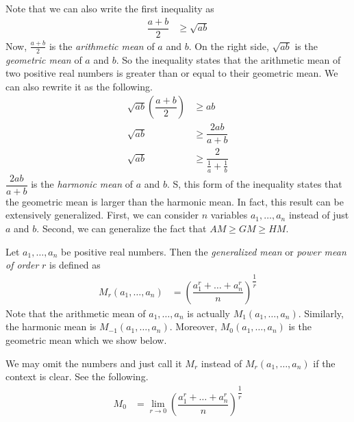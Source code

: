 \documentclass{subfile}
\begin{document}
	Note that we can also write the first inequality as
		\begin{align*}
			\dfrac{a+b}{2}
				& \geq\sqrt{ab}
		\end{align*}
	Now, $\frac{a+b}{2}$ is the \textit{arithmetic mean} of $a$ and $b$. On the right side, $\sqrt{ab}$ is the \textit{geometric mean} of $a$ and $b$. So the inequality states that the arithmetic mean of two positive real numbers is greater than or equal to their geometric mean. We can also rewrite it as the following.
		\begin{align*}
			\sqrt{ab}\left(\dfrac{a+b}{2}\right)
				& \geq ab\\
			\sqrt{ab}
				& \geq\dfrac{2ab}{a+b}\\
			\sqrt{ab}
				& \geq\dfrac{2}{\frac{1}{a}+\frac{1}{b}}
		\end{align*}
	$\dfrac{2ab}{a+b}$ is the \textit{harmonic mean} of $a$ and $b$. S, this form of the inequality states that the geometric mean is larger than the harmonic mean. In fact, this result can be extensively generalized. First, we can consider $n$ variables $a_1,\ldots,a_n$ instead of just $a$ and $b$. Second, we can generalize the fact that $AM\geq GM\geq HM$.
		\begin{definition}
			Let $a_1,\ldots,a_n$ be positive real numbers. Then the \textit{generalized mean} or \textit{power mean of order} $r$ is defined as
				\begin{align*}
					M_r(a_1,\ldots,a_n)
						& = \left(\dfrac{a_1^r+\ldots+a_n^r}{n}\right)^{\dfrac{1}{r}}
				\end{align*}
			Note that the arithmetic mean of $a_1,\ldots,a_n$ is actually $M_1(a_1,\ldots,a_n)$. Similarly, the harmonic mean is $M_{-1}(a_1,\ldots,a_n)$. Moreover, $M_0(a_1,\ldots,a_n)$ is the geometric mean which we show below.
		\end{definition}
	We may omit the numbers and just call it $M_r$ instead of $M_r(a_1,\ldots,a_n)$ if the context is clear. See the following.
		\begin{align*}
			M_0
				& = \lim\limits_{r\to0}\left(\dfrac{a_1^r+\ldots+a_n^r}{n}\right)^{\dfrac{1}{r}}
		\end{align*}
\end{document}
